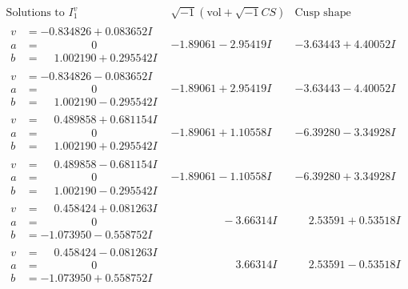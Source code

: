 \documentclass[1p]{elsarticle_modified}
\theoremstyle{definition}
\newcommand{\I}{\sqrt{-1}}
\begin{document}
$$\begin{array}{c|c|c}  
\text{Solutions to }I^v_{1}& \I (\text{vol} + \sqrt{-1}CS) & \text{Cusp shape}\\
 \hline 
\begin{aligned}
v &= -0.834826 + 0.083652 I \\
a &= \phantom{-0.000000 } 0 \\
b &= \phantom{-}1.002190 + 0.295542 I\end{aligned}
 & -1.89061 - 2.95419 I & -3.63443 + 4.40052 I \\ \hline\begin{aligned}
v &= -0.834826 - 0.083652 I \\
a &= \phantom{-0.000000 } 0 \\
b &= \phantom{-}1.002190 - 0.295542 I\end{aligned}
 & -1.89061 + 2.95419 I & -3.63443 - 4.40052 I \\ \hline\begin{aligned}
v &= \phantom{-}0.489858 + 0.681154 I \\
a &= \phantom{-0.000000 } 0 \\
b &= \phantom{-}1.002190 + 0.295542 I\end{aligned}
 & -1.89061 + 1.10558 I & -6.39280 - 3.34928 I \\ \hline\begin{aligned}
v &= \phantom{-}0.489858 - 0.681154 I \\
a &= \phantom{-0.000000 } 0 \\
b &= \phantom{-}1.002190 - 0.295542 I\end{aligned}
 & -1.89061 - 1.10558 I & -6.39280 + 3.34928 I \\ \hline\begin{aligned}
v &= \phantom{-}0.458424 + 0.081263 I \\
a &= \phantom{-0.000000 } 0 \\
b &= -1.073950 - 0.558752 I\end{aligned}
 & \phantom{-0.000000 } -3.66314 I & \phantom{-}2.53591 + 0.53518 I \\ \hline\begin{aligned}
v &= \phantom{-}0.458424 - 0.081263 I \\
a &= \phantom{-0.000000 } 0 \\
b &= -1.073950 + 0.558752 I\end{aligned}
 & \phantom{-0.000000 -}3.66314 I & \phantom{-}2.53591 - 0.53518 I \\ \hline\begin{aligned}

\end{aligned}
\end{array}$$
\end{document}
